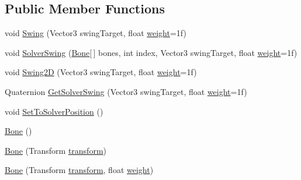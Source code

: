 \subsection*{Public Member Functions}
\begin{DoxyCompactItemize}
\item 
void \mbox{\hyperlink{class_root_motion_1_1_final_i_k_1_1_i_k_solver_1_1_bone_ae07b4aa36657a26b6c902687b5821667}{Swing}} (Vector3 swing\+Target, float \mbox{\hyperlink{class_root_motion_1_1_final_i_k_1_1_i_k_solver_1_1_point_a33184a0e0c8de5a15a1b0fc060f4e4fb}{weight}}=1f)
\item 
void \mbox{\hyperlink{class_root_motion_1_1_final_i_k_1_1_i_k_solver_1_1_bone_a79ab51d8034dae1e5c35bf421f4a78de}{Solver\+Swing}} (\mbox{\hyperlink{class_root_motion_1_1_final_i_k_1_1_i_k_solver_1_1_bone}{Bone}}\mbox{[}$\,$\mbox{]} bones, int index, Vector3 swing\+Target, float \mbox{\hyperlink{class_root_motion_1_1_final_i_k_1_1_i_k_solver_1_1_point_a33184a0e0c8de5a15a1b0fc060f4e4fb}{weight}}=1f)
\item 
void \mbox{\hyperlink{class_root_motion_1_1_final_i_k_1_1_i_k_solver_1_1_bone_a27d9b94cc2925460e0e8ace55259f88e}{Swing2D}} (Vector3 swing\+Target, float \mbox{\hyperlink{class_root_motion_1_1_final_i_k_1_1_i_k_solver_1_1_point_a33184a0e0c8de5a15a1b0fc060f4e4fb}{weight}}=1f)
\item 
Quaternion \mbox{\hyperlink{class_root_motion_1_1_final_i_k_1_1_i_k_solver_1_1_bone_a8255cc87c5043b6ef624ec02c46718e7}{Get\+Solver\+Swing}} (Vector3 swing\+Target, float \mbox{\hyperlink{class_root_motion_1_1_final_i_k_1_1_i_k_solver_1_1_point_a33184a0e0c8de5a15a1b0fc060f4e4fb}{weight}}=1f)
\item 
void \mbox{\hyperlink{class_root_motion_1_1_final_i_k_1_1_i_k_solver_1_1_bone_aa756d52a40f88f5ce1c552bb52704523}{Set\+To\+Solver\+Position}} ()
\item 
\mbox{\hyperlink{class_root_motion_1_1_final_i_k_1_1_i_k_solver_1_1_bone_abb224b61bc7c6bdfcb2a9f7867b3c4b5}{Bone}} ()
\item 
\mbox{\hyperlink{class_root_motion_1_1_final_i_k_1_1_i_k_solver_1_1_bone_ab0c431221a4d5c677430067d44ddd4b1}{Bone}} (Transform \mbox{\hyperlink{class_root_motion_1_1_final_i_k_1_1_i_k_solver_1_1_point_a438b0ff2494f43dfe97c2a1578b1ee06}{transform}})
\item 
\mbox{\hyperlink{class_root_motion_1_1_final_i_k_1_1_i_k_solver_1_1_bone_a018be855921b4f58ac7e1a683ab69fc0}{Bone}} (Transform \mbox{\hyperlink{class_root_motion_1_1_final_i_k_1_1_i_k_solver_1_1_point_a438b0ff2494f43dfe97c2a1578b1ee06}{transform}}, float \mbox{\hyperlink{class_root_motion_1_1_final_i_k_1_1_i_k_solver_1_1_point_a33184a0e0c8de5a15a1b0fc060f4e4fb}{weight}})
\end{DoxyCompactItemize}
